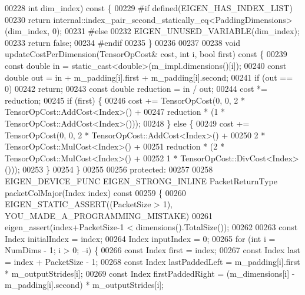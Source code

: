 \begin{DoxyCode}
00228       \textcolor{keywordtype}{int} dim\_index)\textcolor{keyword}{ const }\{
00229 \textcolor{preprocessor}{#if defined(EIGEN\_HAS\_INDEX\_LIST)}
00230     \textcolor{keywordflow}{return} internal::index\_pair\_second\_statically\_eq<PaddingDimensions>(dim\_index, 0);
00231 \textcolor{preprocessor}{#else}
00232     EIGEN\_UNUSED\_VARIABLE(dim\_index);
00233     \textcolor{keywordflow}{return} \textcolor{keyword}{false};
00234 \textcolor{preprocessor}{#endif}
00235   \}
00236 
00237 
00238   \textcolor{keywordtype}{void} updateCostPerDimension(TensorOpCost& cost, \textcolor{keywordtype}{int} i, \textcolor{keywordtype}{bool} first)\textcolor{keyword}{ const }\{
00239     \textcolor{keyword}{const} \textcolor{keywordtype}{double} in = \textcolor{keyword}{static\_cast<}\textcolor{keywordtype}{double}\textcolor{keyword}{>}(m\_impl.dimensions()[i]);
00240     \textcolor{keyword}{const} \textcolor{keywordtype}{double} out = in + m\_padding[i].first + m\_padding[i].second;
00241     \textcolor{keywordflow}{if} (out == 0)
00242       \textcolor{keywordflow}{return};
00243     \textcolor{keyword}{const} \textcolor{keywordtype}{double} reduction = in / out;
00244     cost *= reduction;
00245     \textcolor{keywordflow}{if} (first) \{
00246       cost += TensorOpCost(0, 0, 2 * TensorOpCost::AddCost<Index>() +
00247                     reduction * (1 * TensorOpCost::AddCost<Index>()));
00248     \} \textcolor{keywordflow}{else} \{
00249       cost += TensorOpCost(0, 0, 2 * TensorOpCost::AddCost<Index>() +
00250                                  2 * TensorOpCost::MulCost<Index>() +
00251                     reduction * (2 * TensorOpCost::MulCost<Index>() +
00252                                  1 * TensorOpCost::DivCost<Index>()));
00253     \}
00254   \}
00255 
00256  \textcolor{keyword}{protected}:
00257 
00258   EIGEN\_DEVICE\_FUNC EIGEN\_STRONG\_INLINE PacketReturnType packetColMajor(Index index)\textcolor{keyword}{ const}
00259 \textcolor{keyword}{  }\{
00260     EIGEN\_STATIC\_ASSERT((PacketSize > 1), YOU\_MADE\_A\_PROGRAMMING\_MISTAKE)
00261     eigen\_assert(index+PacketSize-1 < dimensions().TotalSize());
00262 
00263     \textcolor{keyword}{const} Index initialIndex = index;
00264     Index inputIndex = 0;
00265     \textcolor{keywordflow}{for} (\textcolor{keywordtype}{int} i = NumDims - 1; i > 0; --i) \{
00266       \textcolor{keyword}{const} Index first = index;
00267       \textcolor{keyword}{const} Index last = index + PacketSize - 1;
00268       \textcolor{keyword}{const} Index lastPaddedLeft = m\_padding[i].first * m\_outputStrides[i];
00269       \textcolor{keyword}{const} Index firstPaddedRight = (m\_dimensions[i] - m\_padding[i].second) * m\_outputStrides[i];

\end{DoxyCode}
